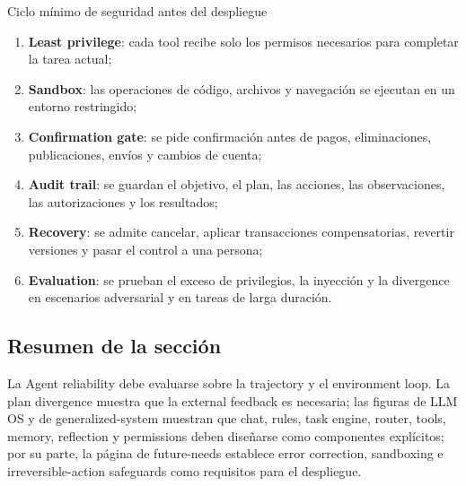 \begin{importantbox}{Ciclo mínimo de seguridad antes del despliegue}
\begin{enumerate}
  \item \textbf{Least privilege}: cada tool recibe solo los permisos necesarios para completar la tarea actual;
  \item \textbf{Sandbox}: las operaciones de código, archivos y navegación se ejecutan en un entorno restringido;
  \item \textbf{Confirmation gate}: se pide confirmación antes de pagos, eliminaciones, publicaciones, envíos y cambios de cuenta;
  \item \textbf{Audit trail}: se guardan el objetivo, el plan, las acciones, las observaciones, las autorizaciones y los resultados;
  \item \textbf{Recovery}: se admite cancelar, aplicar transacciones compensatorias, revertir versiones y pasar el control a una persona;
  \item \textbf{Evaluation}: se prueban el exceso de privilegios, la inyección y la divergence en escenarios adversarial y en tareas de larga duración.
\end{enumerate}
\end{importantbox}


\subsection{Resumen de la sección}

La Agent reliability debe evaluarse sobre la trajectory y el environment loop. La plan divergence muestra que la external feedback es necesaria; las figuras de LLM OS y de generalized-system muestran que chat, rules, task engine, router, tools, memory, reflection y permissions deben diseñarse como componentes explícitos; por su parte, la página de future-needs establece error correction, sandboxing e irreversible-action safeguards como requisitos para el despliegue.
